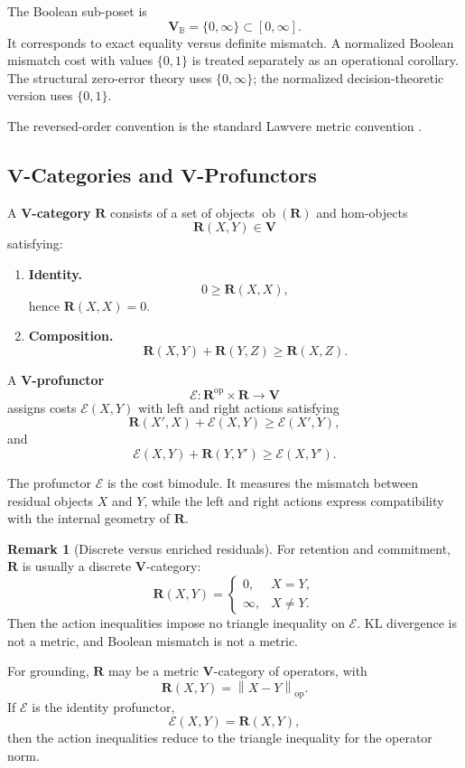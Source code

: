 \documentclass[12pt]{article}
\theoremstyle{definition}
\newtheorem{remark}[theorem]{Remark}
\newcommand{\norm}[1]{\left\lVert#1\right\rVert}
\begin{document}
The Boolean sub-poset is
\[
\mathbf V_{\mathbb B}=\{0,\infty\}\subset[0,\infty].
\]
It corresponds to exact equality versus definite mismatch.  A normalized
Boolean mismatch cost with values $\{0,1\}$ is treated separately as an
operational corollary.  The structural zero-error theory uses
$\{0,\infty\}$; the normalized decision-theoretic version uses $\{0,1\}$.

The reversed-order convention is the standard Lawvere metric convention
\cite{lawvere1973}.

\subsection{$\mathbf V$-Categories and $\mathbf V$-Profunctors}
\label{subsec:V-cats-profunctors}

A \textbf{$\mathbf V$-category} $\mathbf R$ consists of a set of objects
$\operatorname{ob}(\mathbf R)$ and hom-objects
\[
\mathbf R(X,Y)\in\mathbf V
\]
satisfying:
\begin{enumerate}[label=(\roman*),nosep]
\item \textbf{Identity.}
\[
0\ge \mathbf R(X,X),
\]
hence $\mathbf R(X,X)=0$.

\item \textbf{Composition.}
\[
\mathbf R(X,Y)+\mathbf R(Y,Z)\ge \mathbf R(X,Z).
\]
\end{enumerate}

A \textbf{$\mathbf V$-profunctor}
\[
\mathcal E:\mathbf R^{\mathrm{op}}\times\mathbf R\to\mathbf V
\]
assigns costs $\mathcal E(X,Y)$ with left and right actions satisfying
\[
\mathbf R(X',X)+\mathcal E(X,Y)\ge \mathcal E(X',Y),
\]
and
\[
\mathcal E(X,Y)+\mathbf R(Y,Y')\ge \mathcal E(X,Y').
\]

The profunctor $\mathcal E$ is the cost bimodule.  It measures the mismatch
between residual objects $X$ and $Y$, while the left and right actions express
compatibility with the internal geometry of $\mathbf R$.

\begin{remark}[Discrete versus enriched residuals]
\label{rem:discrete-vs-enriched}
For retention and commitment, $\mathbf R$ is usually a discrete
$\mathbf V$-category:
\[
\mathbf R(X,Y)=
\begin{cases}
0,&X=Y,\\
\infty,&X\neq Y.
\end{cases}
\]
Then the action inequalities impose no triangle inequality on $\mathcal E$.
KL divergence is not a metric, and Boolean mismatch is not a metric.

For grounding, $\mathbf R$ may be a metric $\mathbf V$-category of operators,
with
\[
\mathbf R(X,Y)=
\norm{X-Y}_{\mathrm{op}}.
\]
If $\mathcal E$ is the identity profunctor,
\[
\mathcal E(X,Y)=\mathbf R(X,Y),
\]
then the action inequalities reduce to the triangle inequality for the
operator norm.
\end{remark}
\end{document}
